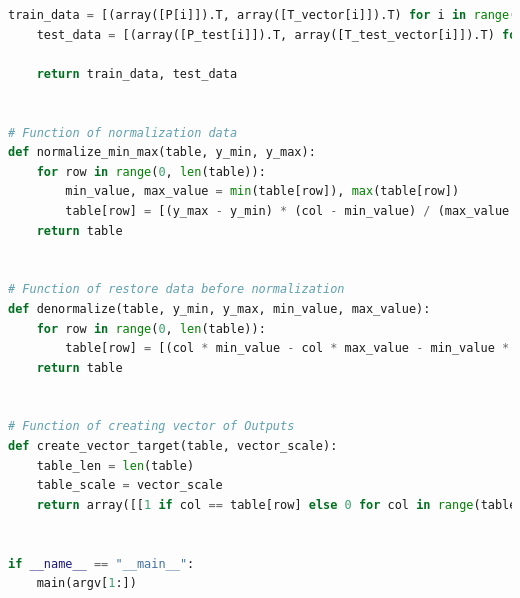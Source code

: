 \documentclass[12pt,twoside]{article}
\begin{document}
\begin{lstlisting}[caption={Plik główny skryptu - main.py},label={Lst:main_py},language=Python,basicstyle=\scriptsize]
    train_data = [(array([P[i]]).T, array([T_vector[i]]).T) for i in range(0, len(T))]
    test_data = [(array([P_test[i]]).T, array([T_test_vector[i]]).T) for i in range(0, len(T_test))]

    return train_data, test_data


# Function of normalization data
def normalize_min_max(table, y_min, y_max):
    for row in range(0, len(table)):
        min_value, max_value = min(table[row]), max(table[row])
        table[row] = [(y_max - y_min) * (col - min_value) / (max_value - min_value) + y_min if min_value != max_value else max_value for col in table[row]]
    return table


# Function of restore data before normalization
def denormalize(table, y_min, y_max, min_value, max_value):
    for row in range(0, len(table)):
        table[row] = [(col * min_value - col * max_value - min_value * y_max + max_value * y_min) / (y_min - y_max) for col in table[row]]
    return table


# Function of creating vector of Outputs
def create_vector_target(table, vector_scale):
    table_len = len(table)
    table_scale = vector_scale
    return array([[1 if col == table[row] else 0 for col in range(table_scale)] for row in range(table_len)])


if __name__ == "__main__":
    main(argv[1:])
\end{lstlisting}
\newpage
\end{document}
